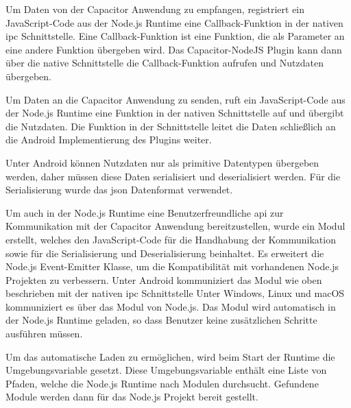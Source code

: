 \vspace{-1em}

Um Daten von der Capacitor Anwendung zu empfangen, registriert ein JavaScript-Code aus der Node.js Runtime eine Callback-Funktion in der nativen \ac{ipc} Schnittstelle.
Eine Callback-Funktion ist eine Funktion, die als Parameter an eine andere Funktion übergeben wird.
Das Capacitor-NodeJS Plugin kann dann über die native Schnittstelle die Callback-Funktion aufrufen und Nutzdaten übergeben.

Um Daten an die Capacitor Anwendung zu senden, ruft ein JavaScript-Code aus der Node.js Runtime eine Funktion in der nativen Schnittstelle auf und übergibt die Nutzdaten.
Die Funktion in der Schnittstelle leitet die Daten schließlich an die Android Implementierung des Plugins weiter.

Unter Android können Nutzdaten nur als primitive Datentypen übergeben werden, daher müssen diese Daten serialisiert und deserialisiert werden.
Für die Serialisierung wurde das \ac{json} Datenformat verwendet.

Um auch in der Node.js Runtime eine Benutzerfreundliche \ac{api} zur Kommunikation mit der Capacitor Anwendung bereitzustellen, wurde ein  Modul erstellt, welches den JavaScript-Code für die Handhabung der Kommunikation sowie für die Serialisierung und Deserialisierung beinhaltet.
Es erweitert die Node.js Event-Emitter Klasse, um die Kompatibilität mit vorhandenen Node.js Projekten zu verbessern.
Unter Android kommuniziert das Modul wie oben beschrieben mit der nativen \ac{ipc} Schnittstelle
Unter Windows, Linux und macOS kommuniziert es über das  Modul von Node.js.
Das  Modul wird automatisch in der Node.js Runtime geladen, so dass Benutzer keine zusätzlichen Schritte ausführen müssen.

Um das automatische Laden zu ermöglichen, wird beim Start der Runtime die Umgebungsvariable  gesetzt.
Diese Umgebungsvariable enthält eine Liste von Pfaden, welche die Node.js Runtime nach Modulen durchsucht.
Gefundene Module werden dann für das Node.js Projekt bereit gestellt.
\cite{nodejs-mobile:docs, nodejs}
